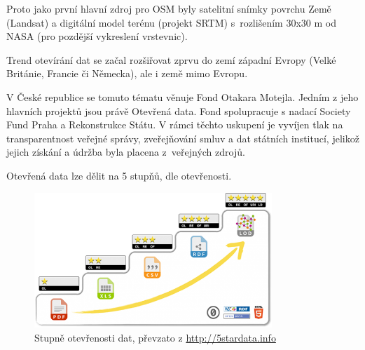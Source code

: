 Proto jako první hlavní zdroj pro OSM byly satelitní snímky povrchu Země (Landsat) %
a digitální model terénu (projekt SRTM) %
s~rozlišením 30x30 m od NASA (pro pozdější vykreslení vrstevnic).

Trend otevírání dat se začal rozšiřovat zprvu do zemí západní Evropy
(Velké Británie, Francie či Německa), ale i země mimo Evropu.\cite{OpendataTrends}

V České republice se tomuto tématu věnuje Fond Otakara Motejla. Jedním z jeho hlavních projektů jsou právě Otevřená data. Fond spolupracuje s nadací Society Fund
Praha a Rekonstrukce Státu.
V rámci těchto uskupení je vyvíjen tlak na transparentnost veřejné správy,
zveřejňování smluv a dat státních institucí, jelikož jejich získání a údržba byla
placena z~veřejných zdrojů.

\newpage
Otevřená data lze dělit na 5 stupňů,
dle otevřenosti.

\begin{figure}[hbt]%
    \centering
    \includegraphics[width=0.8\textwidth]{./pictures/5star-steps.png}
    \caption{Stupně otevřenosti dat, převzato z \url{http://5stardata.info}}
    \label{fig:Stupně otevřenosti dat}
\end{figure}


